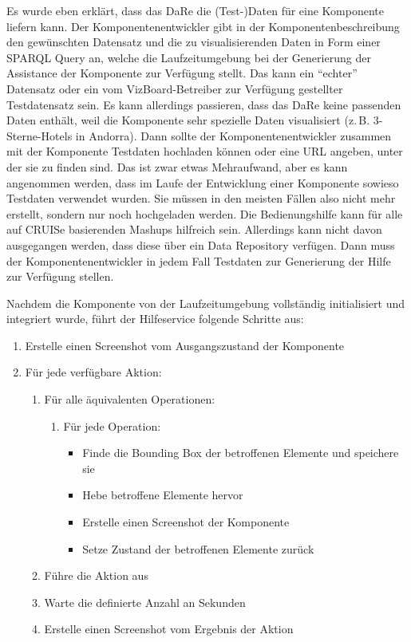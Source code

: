 \documentclass[
	headsepline,
	footsepline,
	fontsize=12pt,
	bibliography=totoc
]{scrbook}
\begin{document}
Es wurde eben erklärt, dass das DaRe die (Test-)Daten für eine Komponente liefern kann. Der Komponentenentwickler gibt in der Komponentenbeschreibung den gewünschten Datensatz und die zu visualisierenden Daten in Form einer SPARQL Query an, welche die Laufzeitumgebung bei der Generierung der Assistance der Komponente zur Verfügung stellt. Das kann ein \enquote{echter} Datensatz oder ein vom VizBoard-Betreiber zur Verfügung gestellter Testdatensatz sein. Es kann allerdings passieren, dass das DaRe keine passenden Daten enthält, weil die Komponente sehr spezielle Daten visualisiert (z.\,B. 3-Sterne-Hotels in Andorra). Dann sollte der Komponentenentwickler zusammen mit der Komponente Testdaten hochladen können oder eine URL angeben, unter der sie zu finden sind. Das ist zwar etwas Mehraufwand, aber es kann angenommen werden, dass im Laufe der Entwicklung einer Komponente sowieso Testdaten verwendet wurden. Sie müssen in den meisten Fällen also nicht mehr erstellt, sondern nur noch hochgeladen werden. Die Bedienungshilfe kann für alle auf CRUISe basierenden Mashups hilfreich sein. Allerdings kann nicht davon ausgegangen werden, dass diese über ein Data Repository verfügen. Dann muss der Komponentenentwickler in jedem Fall Testdaten zur Generierung der Hilfe zur Verfügung stellen.

Nachdem die Komponente von der Laufzeitumgebung vollständig initialisiert und integriert wurde, führt der Hilfeservice folgende Schritte aus:

\begin{enumerate}
	\item Erstelle einen Screenshot vom Ausgangszustand der Komponente
	\item Für jede verfügbare Aktion:
	\begin{enumerate}
		\item Für alle äquivalenten Operationen:
		\begin{enumerate}
			\item Für jede Operation:
			\begin{itemize}
				\item Finde die Bounding Box der betroffenen Elemente und speichere sie
				\item Hebe betroffene Elemente hervor
				\item Erstelle einen Screenshot der Komponente
				\item Setze Zustand der betroffenen Elemente zurück
			\end{itemize}
		\end{enumerate}
		\item Führe die Aktion aus
		\item Warte die definierte Anzahl an Sekunden
		\item Erstelle einen Screenshot vom Ergebnis der Aktion
	\end{enumerate}
\end{enumerate}
\end{document}
